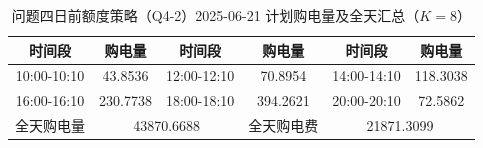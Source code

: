 \begin{table}[htbp]
\centering
\caption{问题四日前额度策略（Q4-2）2025-06-21 计划购电量及全天汇总（$K=8$）}\label{tab:q4-purchase}
\normalsize\setlength{\tabcolsep}{5pt}
\begin{tabular}{@{}cccccc@{}}
\toprule
时间段 & 购电量 & 时间段 & 购电量 & 时间段 & 购电量 \\
\midrule
10:00-10:10 & 43.8536 & 12:00-12:10 & 70.8954 & 14:00-14:10 & 118.3038 \\
16:00-16:10 & 230.7738 & 18:00-18:10 & 394.2621 & 20:00-20:10 & 72.5862 \\
全天购电量 & \multicolumn{2}{c}{43870.6688} & 全天购电费 & \multicolumn{2}{c}{21871.3099} \\
\bottomrule
\end{tabular}
\end{table}
